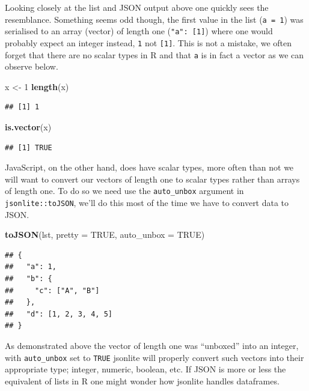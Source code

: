 \documentclass[
]{krantz}
\makeatletter
\newenvironment{Shaded}{\begin{snugshade}}{\end{snugshade}}
\newcommand{\DataTypeTok}[1]{\textcolor[rgb]{0.27,0.27,0.27}{#1}}
\newcommand{\DecValTok}[1]{\textcolor[rgb]{0.06,0.06,0.06}{#1}}
\newcommand{\KeywordTok}[1]{\textcolor[rgb]{0.27,0.27,0.27}{\textbf{#1}}}
\newcommand{\NormalTok}[1]{#1}
\newcommand{\OtherTok}[1]{\textcolor[rgb]{0.37,0.37,0.37}{#1}}
\newcommand{\StringTok}[1]{\textcolor[rgb]{0.5,0.5,0.5}{#1}}
\newenvironment{kframe}{%
\medskip{}
\setlength{\fboxsep}{.8em}
 \def\at@end@of@kframe{}%
 \ifinner\ifhmode%
  \def\at@end@of@kframe{\end{minipage}}%
  \begin{minipage}{\columnwidth}%
 \fi\fi%
 \def\FrameCommand##1{\hskip\@totalleftmargin \hskip-\fboxsep
 \colorbox{shadecolor}{##1}\hskip-\fboxsep
     \hskip-\linewidth \hskip-\@totalleftmargin \hskip\columnwidth}%
 \MakeFramed {\advance\hsize-\width
   \@totalleftmargin\z@ \linewidth\hsize
   \@setminipage}}%
 {\par\unskip\endMakeFramed%
 \at@end@of@kframe}
\renewenvironment{Shaded}{\begin{kframe}}{\end{kframe}}
\makeatother
\begin{document}
Looking closely at the list and JSON output above one quickly sees the resemblance. Something seems odd though, the first value in the list (\texttt{a\ =\ 1}) was serialised to an array (vector) of length one (\texttt{"a":\ {[}1{]}}) where one would probably expect an integer instead, \texttt{1} not \texttt{{[}1{]}}. This is not a mistake, we often forget that there are no scalar types in R and that \texttt{a} is in fact a vector as we can observe below.

\begin{Shaded}
\begin{Highlighting}[]
\NormalTok{x <{-}}\StringTok{ }\DecValTok{1}
\KeywordTok{length}\NormalTok{(x)}
\end{Highlighting}
\end{Shaded}

\begin{verbatim}
## [1] 1
\end{verbatim}

\begin{Shaded}
\begin{Highlighting}[]
\KeywordTok{is.vector}\NormalTok{(x)}
\end{Highlighting}
\end{Shaded}

\begin{verbatim}
## [1] TRUE
\end{verbatim}

JavaScript, on the other hand, does have scalar types, more often than not we will want to convert our vectors of length one to scalar types rather than arrays of length one. To do so we need use the \texttt{auto\_unbox} argument in \texttt{jsonlite::toJSON}, we'll do this most of the time we have to convert data to JSON.

\begin{Shaded}
\begin{Highlighting}[]
\KeywordTok{toJSON}\NormalTok{(lst, }\DataTypeTok{pretty =} \OtherTok{TRUE}\NormalTok{, }\DataTypeTok{auto\_unbox =} \OtherTok{TRUE}\NormalTok{)}
\end{Highlighting}
\end{Shaded}

\begin{verbatim}
## {
##   "a": 1,
##   "b": {
##     "c": ["A", "B"]
##   },
##   "d": [1, 2, 3, 4, 5]
## }
\end{verbatim}

As demonstrated above the vector of length one was ``unboxed'' into an integer, with \texttt{auto\_unbox} set to \texttt{TRUE} jsonlite will properly convert such vectors into their appropriate type; integer, numeric, boolean, etc. If JSON is more or less the equivalent of lists in R one might wonder how jsonlite handles dataframes.
\end{document}
